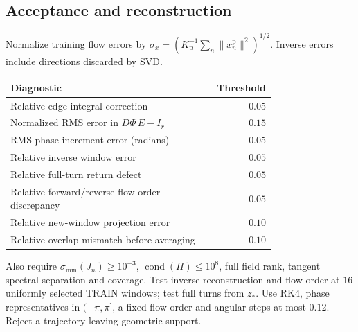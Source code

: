 \documentclass[11pt,a4paper]{article}
\begin{document}
\subsection*{Acceptance and reconstruction}
Normalize training flow errors by
$\sigma_x=(K_{\mathrm p}^{-1}\sum_n\|x_n^{\mathrm p}\|^2)^{1/2}$.
Inverse errors include directions discarded by SVD.
\begin{center}
\begin{tabular}{@{}p{0.76\linewidth}r@{}}
\toprule
Diagnostic & Threshold\\
\midrule
Relative edge-integral correction & $0.05$\\
Normalized RMS error in $D\Phi\,E-I_r$ & $0.15$\\
RMS phase-increment error (radians) & $0.05$\\
Relative inverse window error & $0.05$\\
Relative full-turn return defect & $0.05$\\
Relative forward/reverse flow-order discrepancy & $0.05$\\
Relative new-window projection error & $0.10$\\
Relative overlap mismatch before averaging & $0.10$\\
\bottomrule
\end{tabular}
\end{center}
Also require $\sigma_{\min}(J_n)\ge10^{-3}$,
$\operatorname{cond}(\Pi)\le10^8$, full field rank, tangent spectral
separation and coverage. Test inverse reconstruction and flow order at
$16$ uniformly selected TRAIN windows; test full turns from $z_*$.
Use RK4, phase representatives in $(-\pi,\pi]$, a fixed flow order and
angular steps at most $0.12$. Reject a trajectory leaving geometric support.
\end{document}
